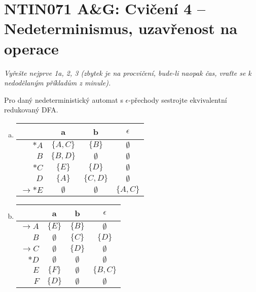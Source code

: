 \documentclass[a4paper,12pt]{amsart}
\begin{document}
\thispagestyle{empty}

\section*{NTIN071 A\&G: Cvičení 4 -- Nedeterminismus, uzavřenost na operace}


\medskip

\noindent\emph{Vyřešte nejprve 1a, 2, 3 (zbytek je na procvičení, bude-li naopak čas, vraťte se k nedodělaným příkladům z minule).}

\medskip


\medskip\begin{problem}

    Pro daný nedeterministický automat s $\epsilon$-přechody sestrojte ekvivalentní redukovaný DFA.
    
    \begin{multicols}{2}
    
        \begin{enumerate}[(a)]
            \item
            \begin{tabular}{ r | c c c }
            & a & b & $\epsilon$ \\ \hline
            $\ast A$ & $\{A,C\}$ & $\{B\}$ & $\emptyset$ \\
            $B$ & $\{B,D\}$ & $\emptyset$ & $\emptyset$ \\
            $\ast C$ & $\{E\}$ & $\{D\}$ & $\emptyset$ \\
            $D$ & $\{A\}$ & $\{C,D\}$ & $\emptyset$ \\
            $\to\ast E$ & $\emptyset$ & $\emptyset$ & $\{A,C\}$
            \end{tabular}
            
            \item
            \begin{tabular}{ r | c c c }
            & a & b & $\epsilon$ \\ \hline
            $\to A$ & $\{E\}$ & $\{B\}$ & $\emptyset$ \\
            $B$ & $\emptyset$ & $\{C\}$ & $\{D\}$ \\
            $\to C$ & $\emptyset$ & $\{D\}$ & $\emptyset$ \\
            $\ast D$ & $\emptyset$ & $\emptyset$ & $\emptyset$ \\
            $E$ & $\{F\}$ & $\emptyset$ & $\{B,C\}$\\
            $F$ & $\{D\}$ & $\emptyset$ & $\emptyset$
            \end{tabular}
            
        \end{enumerate}
    
    \end{multicols}
\end{problem}
\end{document}
